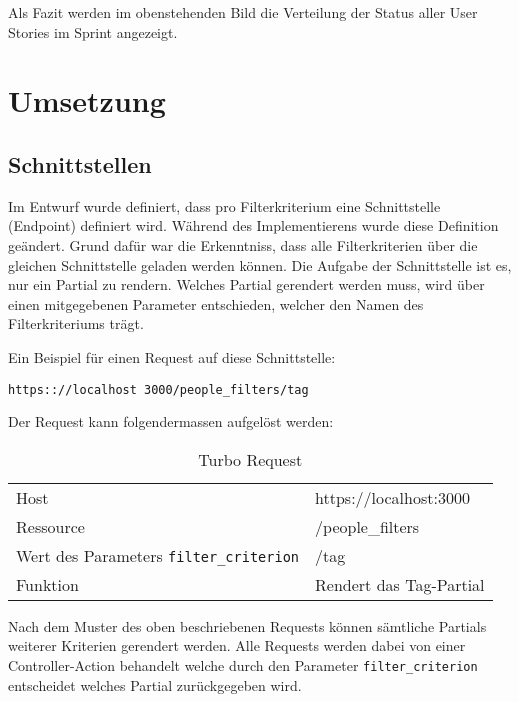 Als Fazit werden im obenstehenden Bild die Verteilung der Status aller User Stories im Sprint angezeigt.

\newpage

\chapter{Umsetzung}

\section{Schnittstellen}
Im Entwurf wurde definiert, dass pro Filterkriterium eine Schnittstelle (Endpoint) definiert wird. Während des Implementierens wurde diese Definition geändert.
Grund dafür war die Erkenntniss, dass alle Filterkriterien über die gleichen Schnittstelle geladen werden können. Die Aufgabe der Schnittstelle ist es, 
nur ein Partial zu rendern. Welches Partial gerendert werden muss, wird über einen mitgegebenen Parameter entschieden, welcher den Namen des Filterkriteriums trägt.

Ein Beispiel für einen Request auf diese Schnittstelle: 

\texttt{https:://localhost 3000/people\_filters/tag} 

Der Request kann folgendermassen aufgelöst werden:

\begin{table}[h!]
   \begin{tabular}{|L{0.4\textwidth}|L{0.6\textwidth}|}
       \hline
         \\[12pt]
       \hline
        Host & https://localhost:3000 \\
       \hline
       Ressource & /people\_filters \\
       \hline
        Wert des Parameters \texttt{filter\_criterion} & /tag \\
       \hline
       Funktion & Rendert das Tag-Partial \\
     \hline
     \end{tabular}
     \caption{Turbo Request}
\end{table}

Nach dem Muster des oben beschriebenen Requests können sämtliche Partials weiterer Kriterien gerendert werden.
Alle Requests werden dabei von einer Controller-Action behandelt welche durch den Parameter \texttt{filter\_criterion}
entscheidet welches Partial zurückgegeben wird.


